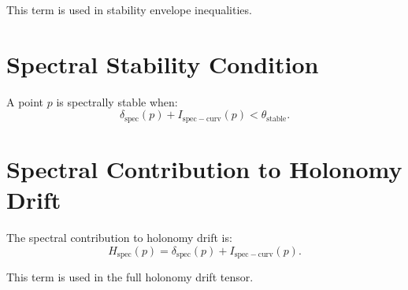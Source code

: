\documentclass[11pt]{article}
\begin{document}
This term is used in stability envelope inequalities.

\section{Spectral Stability Condition}

A point $p$ is spectrally stable when:
\[
\delta_{\mathrm{spec}}(p)
  + I_{\mathrm{spec-curv}}(p)
  < \theta_{\mathrm{stable}}.
\]

\section{Spectral Contribution to Holonomy Drift}

The spectral contribution to holonomy drift is:
\[
H_{\mathrm{spec}}(p)
  = \delta_{\mathrm{spec}}(p)
    + I_{\mathrm{spec-curv}}(p).
\]

This term is used in the full holonomy drift tensor.
\end{document}
